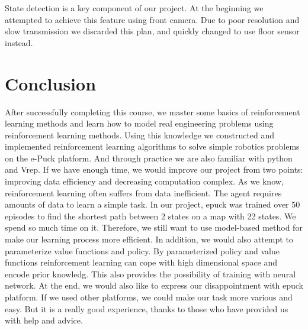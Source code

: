 \documentclass[a4paper, 11pt]{article} %
\begin{document}
State
detection is a key component of our project. At the beginning we attempted to
achieve this feature using front camera. Due to poor resolution and slow transmission
we discarded this plan, and quickly changed to use floor sensor instead.

\section{Conclusion}
After successfully completing this course, we master some basics of reinforcement
learning methods and learn how to model real engineering problems using reinforcement
learning methods. Using this knowledge we constructed and implemented reinforcement
learning algorithms to solve simple robotics problems on the e-Puck platform. And
through practice we are also familiar with python and Vrep. If we have enough time,
we would improve our project from two points: improving data efficiency and
decreasing computation complex. As we know, reinforcement learning often suffers
from data inefficient. The agent requires amounts of data to learn a simple task.
In our project, epuck was trained over 50 episodes to find the shortest path
between 2 states on a map with 22 states. We spend so much time on it. Therefore,
we still want to use model-based method for make our learning process more efficient.
In addition, we would also attempt to parameterize value functions and policy. By
parameterized policy and value functions reinforcement learning can cope with high
dimensional space and encode prior knowledg. This also provides the possibility of
training with neural network. At the end, we would also like to express our
disappointment with epuck platform. If we used other platforms, we could make our
task more various and easy. But it is a really good experience, thanks to those
who have provided us with help and advice.
\end{document}
